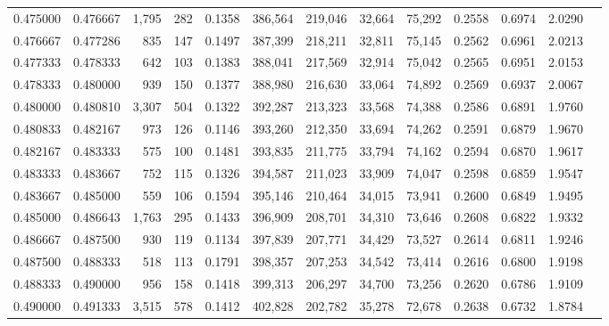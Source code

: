 \begin{tabular}{rrrrrrrrrrrrr}
0.475000 & 0.476667 & 1,795 & 282 &                                     0.1358 & 386,564 & 219,046 &  32,664 &  75,292 & 0.2558 & 0.6974 & 2.0290 \\
0.476667 & 0.477286 &   835 & 147 &                                     0.1497 & 387,399 & 218,211 &  32,811 &  75,145 & 0.2562 & 0.6961 & 2.0213 \\
0.477333 & 0.478333 &   642 & 103 &                                     0.1383 & 388,041 & 217,569 &  32,914 &  75,042 & 0.2565 & 0.6951 & 2.0153 \\
0.478333 & 0.480000 &   939 & 150 &                                     0.1377 & 388,980 & 216,630 &  33,064 &  74,892 & 0.2569 & 0.6937 & 2.0067 \\
0.480000 & 0.480810 & 3,307 & 504 &                                     0.1322 & 392,287 & 213,323 &  33,568 &  74,388 & 0.2586 & 0.6891 & 1.9760 \\
0.480833 & 0.482167 &   973 & 126 &                                     0.1146 & 393,260 & 212,350 &  33,694 &  74,262 & 0.2591 & 0.6879 & 1.9670 \\
0.482167 & 0.483333 &   575 & 100 &                                     0.1481 & 393,835 & 211,775 &  33,794 &  74,162 & 0.2594 & 0.6870 & 1.9617 \\
0.483333 & 0.483667 &   752 & 115 &                                     0.1326 & 394,587 & 211,023 &  33,909 &  74,047 & 0.2598 & 0.6859 & 1.9547 \\
0.483667 & 0.485000 &   559 & 106 &                                     0.1594 & 395,146 & 210,464 &  34,015 &  73,941 & 0.2600 & 0.6849 & 1.9495 \\
0.485000 & 0.486643 & 1,763 & 295 &                                     0.1433 & 396,909 & 208,701 &  34,310 &  73,646 & 0.2608 & 0.6822 & 1.9332 \\
0.486667 & 0.487500 &   930 & 119 &                                     0.1134 & 397,839 & 207,771 &  34,429 &  73,527 & 0.2614 & 0.6811 & 1.9246 \\
0.487500 & 0.488333 &   518 & 113 &                                     0.1791 & 398,357 & 207,253 &  34,542 &  73,414 & 0.2616 & 0.6800 & 1.9198 \\
0.488333 & 0.490000 &   956 & 158 &                                     0.1418 & 399,313 & 206,297 &  34,700 &  73,256 & 0.2620 & 0.6786 & 1.9109 \\
0.490000 & 0.491333 & 3,515 & 578 &                                     0.1412 & 402,828 & 202,782 &  35,278 &  72,678 & 0.2638 & 0.6732 & 1.8784 \\

\end{tabular}
